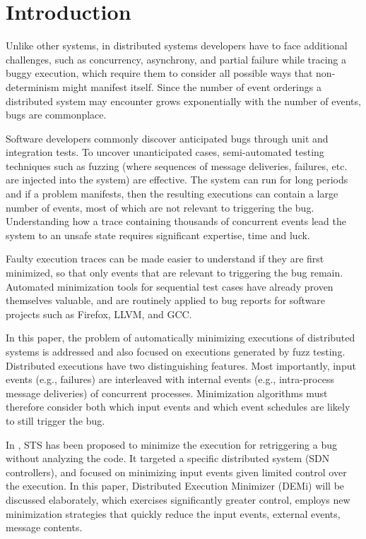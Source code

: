 \section{Introduction}
Unlike other systems, in distributed systems developers have to face additional challenges, such as concurrency,
asynchrony, and partial failure while tracing a buggy execution, which require them to consider all possible ways that non-determinism might manifest itself. Since the number of event orderings a distributed system may encounter grows exponentially with the number of events, bugs are commonplace.

Software developers commonly discover anticipated bugs through unit and integration tests. To uncover unanticipated cases, semi-automated testing techniques such as fuzzing (where sequences of message deliveries, failures, etc. are injected into the system) are effective. The system can run for long periods and if a problem manifests, then the resulting executions can contain a large number of events, most of which are not relevant to triggering the bug. Understanding how a trace containing thousands of concurrent events lead the system to an unsafe state requires significant expertise, time and luck.

Faulty execution traces can be made easier to understand if they are first minimized, so that only events that
are relevant to triggering the bug remain. Automated minimization tools for sequential test cases \cite{1,2} have already proven themselves valuable, and are routinely applied to bug reports for software projects such as Firefox, LLVM, and GCC.


In this paper, the problem of automatically minimizing executions of distributed systems is addressed and also  focused on executions generated by fuzz testing. Distributed executions have two distinguishing features. Most importantly, input events (e.g., failures) are interleaved with internal events (e.g., intra-process message deliveries) of concurrent processes. Minimization algorithms must therefore consider both which input events and which event schedules are likely to still trigger the bug.

In \cite{3}, STS has been  proposed to minimize the execution for retriggering a bug without analyzing the code. It targeted a specific distributed system (SDN controllers), and focused on minimizing input events given limited control over the execution. In this paper, Distributed Execution Minimizer (DEMi) will be discussed elaborately, which exercises significantly greater control, employs new minimization strategies that quickly reduce the input events, external events, message contents.

